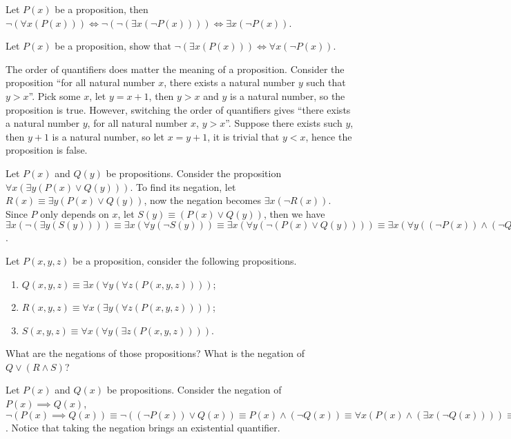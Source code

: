\documentclass[10pt]{article}
\begin{document}
\begin{example}
    Let $P(x)$ be a proposition, then $\neg(\forall x(P(x)))\iff\neg(\neg(\exists x(\neg P(x))))\iff\exists x(\neg P(x))$. 
\end{example}
\begin{problem}
    Let $P(x)$ be a proposition, show that $\neg(\exists x(P(x)))\iff\forall x(\neg P(x))$.
\end{problem}
\par
The order of quantifiers does matter the meaning of a proposition. Consider the proposition ``for all natural number $x$, there exists a natural number $y$ such that $y>x$''. Pick some $x$, let $y=x+1$, then $y>x$ and $y$ is a natural number, so the proposition is true. However, switching the order of quantifiers gives ``there exists a natural number $y$, for all natural number $x$, $y>x$''. Suppose there exists such $y$, then $y+1$ is a natural number, so let $x=y+1$, it is trivial that $y<x$, hence the proposition is false.
\begin{example}
    Let $P(x)$ and $Q(y)$ be propositions. Consider the proposition $\forall x(\exists y(P(x)\vee Q(y)))$. To find its negation, let $R(x)\equiv\exists y(P(x)\vee Q(y))$, now the negation becomes $\exists x(\neg R(x))$. Since $P$ only depends on $x$, let $S(y)\equiv(P(x)\vee Q(y))$, then we have $\exists x(\neg(\exists y(S(y))))\equiv\exists x(\forall y(\neg S(y)))\equiv\exists x(\forall y(\neg(P(x)\vee Q(y))))\equiv\exists x(\forall y((\neg P(x))\wedge(\neg Q(y))))$.
\end{example}
\begin{problem}
    Let $P(x,y,z)$ be a proposition, consider the following propositions.
    \begin{enumerate}
        \item $Q(x,y,z)\equiv\exists x(\forall y(\forall z(P(x,y,z))))$;
        \item $R(x,y,z)\equiv\forall x(\exists y(\forall z(P(x,y,z))))$;
        \item $S(x,y,z)\equiv\forall x(\forall y(\exists z(P(x,y,z))))$.
    \end{enumerate}
    What are the negations of those propositions? What is the negation of $Q\vee(R\wedge S)$?
\end{problem}
\begin{example}
    Let $P(x)$ and $Q(x)$ be propositions. Consider the negation of $P(x)\implies Q(x)$, $\neg(P(x)\implies Q(x))\equiv\neg((\neg P(x))\vee Q(x))\equiv P(x)\wedge(\neg Q(x))\equiv\forall x(P(x)\wedge(\exists x(\neg Q(x))))\equiv\exists x(P(x)\wedge(\neg Q(x)))$. Notice that taking the negation brings an existential quantifier.
\end{example}
\end{document}
